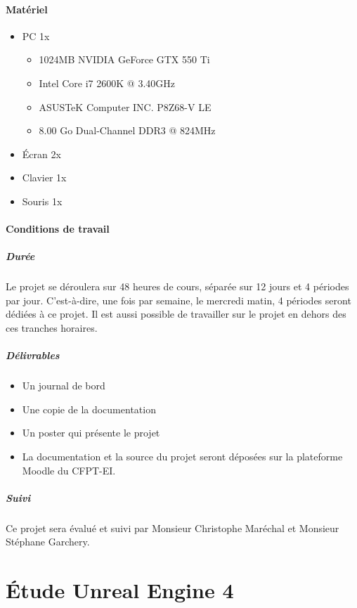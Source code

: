 \documentclass[11pt, a4paper, oneside]{article}
\begin{document}
\subsection{Matériel}
\begin{itemize}
\item PC 1x
	\begin{itemize}
	\item 1024MB NVIDIA GeForce GTX 550 Ti
	\item Intel Core i7 2600K @ 3.40GHz
	\item ASUSTeK Computer INC. P8Z68-V LE
	\item 8.00 Go Dual-Channel DDR3 @ 824MHz
	\end{itemize}
\item Écran 2x
\item Clavier 1x
\item Souris 1x
\end{itemize}
\subsection{Conditions de travail}
\subsubsection{Durée}
Le projet se déroulera sur 48 heures de cours, séparée sur 12 jours et 4 périodes par jour. C'est-à-dire, une fois par semaine, le mercredi matin, 4 périodes seront dédiées à ce projet. Il est aussi possible de travailler sur le projet en dehors des ces tranches horaires.
\subsubsection{Délivrables}
\begin{itemize}
\item Un journal de bord
\item Une copie de la documentation
\item Un poster qui présente le projet
\item La documentation et la source du projet seront déposées sur la plateforme Moodle du CFPT-EI.
\end{itemize}
\subsubsection{Suivi}
Ce projet sera évalué et suivi par Monsieur Christophe Maréchal et Monsieur Stéphane Garchery.
\newpage
\part{Étude Unreal Engine 4}
\end{document}
